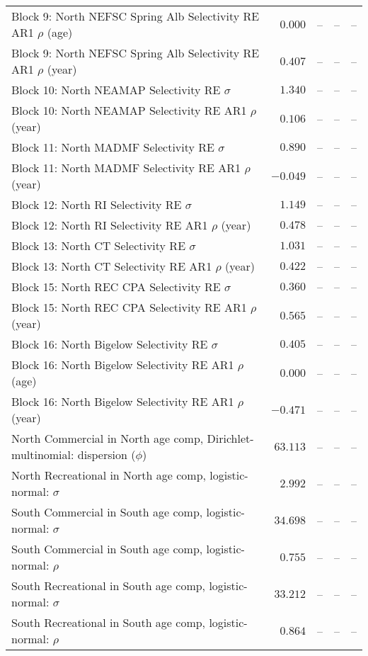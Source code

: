 \documentclass[
]{article}
\begin{document}
\begin{landscape}
\begin{longtable}[t]{lrrrr}
Block 9: North NEFSC Spring Alb Selectivity RE AR1 $\rho$ (age) & $0.000$ & -- & -- & --\\
Block 9: North NEFSC Spring Alb Selectivity RE AR1 $\rho$ (year) & $0.407$ & -- & -- & --\\
Block 10: North NEAMAP Selectivity RE $\sigma$ & $1.340$ & -- & -- & --\\
\addlinespace
Block 10: North NEAMAP Selectivity RE AR1 $\rho$ (year) & $0.106$ & -- & -- & --\\
Block 11: North MADMF Selectivity RE $\sigma$ & $0.890$ & -- & -- & --\\
Block 11: North MADMF Selectivity RE AR1 $\rho$ (year) & $-0.049$ & -- & -- & --\\
Block 12: North RI Selectivity RE $\sigma$ & $1.149$ & -- & -- & --\\
Block 12: North RI Selectivity RE AR1 $\rho$ (year) & $0.478$ & -- & -- & --\\
\addlinespace
Block 13: North CT Selectivity RE $\sigma$ & $1.031$ & -- & -- & --\\
Block 13: North CT Selectivity RE AR1 $\rho$ (year) & $0.422$ & -- & -- & --\\
Block 15: North REC CPA Selectivity RE $\sigma$ & $0.360$ & -- & -- & --\\
Block 15: North REC CPA Selectivity RE AR1 $\rho$ (year) & $0.565$ & -- & -- & --\\
Block 16: North Bigelow Selectivity RE $\sigma$ & $0.405$ & -- & -- & --\\
\addlinespace
Block 16: North Bigelow Selectivity RE AR1 $\rho$ (age) & $0.000$ & -- & -- & --\\
Block 16: North Bigelow Selectivity RE AR1 $\rho$ (year) & $-0.471$ & -- & -- & --\\
North Commercial in North age comp, Dirichlet-multinomial: dispersion ($\phi$) & $63.113$ & -- & -- & --\\
North Recreational in North age comp, logistic-normal: $\sigma$ & $2.992$ & -- & -- & --\\
South Commercial in South age comp, logistic-normal: $\sigma$ & $34.698$ & -- & -- & --\\
\addlinespace
South Commercial in South age comp, logistic-normal: $\rho$ & $0.755$ & -- & -- & --\\
South Recreational in South age comp, logistic-normal: $\sigma$ & $33.212$ & -- & -- & --\\
South Recreational in South age comp, logistic-normal: $\rho$ & $0.864$ & -- & -- & --\\

\end{longtable}
\end{landscape}
\end{document}

